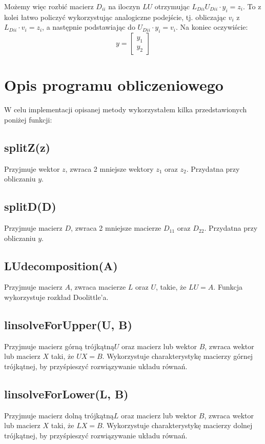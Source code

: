 \documentclass{article}
\begin{document}
Możemy więc rozbić macierz \(D_{ii}\) na iloczyn \(LU\) otrzymując \(L_{Dii} U_{Dii} \cdot y_i = z_i\). To z kolei łatwo policzyć wykorzystując analogiczne podejście, tj. obliczając \(v_i\) z \(L_{Dii} \cdot v_i = z_i\), a następnie podstawiając do \(U_{Dii} \cdot y_i = v_i\). Na koniec oczywiście:
\[
    y = 
    \begin{bmatrix}
        y_1 \\
        y_2
    \end{bmatrix}
\]
\vspace{10pt}
\section{Opis programu obliczeniowego}
W celu implementacji opisanej metody wykorzystałem kilka przedstawionych poniżej funkcji:
    \subsection*{splitZ(z)}
Przyjmuje wektor \(z\), zwraca 2 mniejsze wektory \(z_1\) oraz \(z_2\). Przydatna przy obliczaniu \(y\).
    \subsection*{splitD(D)}
Przyjmuje macierz \(D\), zwraca 2 mniejsze macierze \(D_{11}\) oraz \(D_{22}\). Przydatna przy obliczaniu \(y\).
    \subsection*{LUdecomposition(A)}
Przyjmuje macierz \(A\), zwraca macierze \(L\) oraz \(U\), takie, że \(LU = A\). Funkcja wykorzystuje rozkład Doolittle'a.
    \subsection*{linsolveForUpper(U, B)}
Przyjmuje macierz górną trójkątną\(U\) oraz macierz lub wektor \(B\), zwraca wektor lub macierz \(X\) taki, że \(UX = B\). Wykorzystuje charakterystykę macierzy górnej trójkątnej, by przyśpieszyć rozwiązywanie układu równań.
    \subsection*{linsolveForLower(L, B)}
Przyjmuje macierz dolną trójkątną\(L\) oraz macierz lub wektor \(B\), zwraca wektor lub macierz \(X\) taki, że \(LX = B\). Wykorzystuje charakterystykę macierzy dolnej trójkątnej, by przyśpieszyć rozwiązywanie układu równań.
\end{document}
